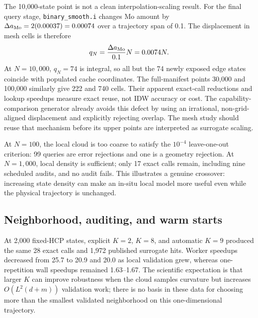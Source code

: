 \documentclass[11pt]{article}
\newcommand{\code}[1]{\texttt{#1}}
\begin{document}
The 10,000-state point is not a clean interpolation-scaling result.  For the final query stage,
\code{binary\_smooth.i} changes Mo amount by
\(\Delta a_{\rm Mo}=2(0.00037)=0.00074\) over a trajectory span of 0.1.  The displacement in mesh
cells is therefore
\begin{equation}
  q_N=\frac{\Delta a_{\rm Mo}}{0.1}N=0.0074N.
\end{equation}
At \(N=10{,}000\), \(q_N=74\) is integral, so all but the 74 newly exposed edge states coincide
with populated cache coordinates.  The full-manifest points 30,000 and 100,000 similarly give 222
and 740 cells.  Their apparent exact-call reductions and lookup speedups measure exact reuse, not
IDW accuracy or cost.  The capability-comparison generator already avoids this defect by using an
irrational, non-grid-aligned displacement and explicitly rejecting overlap.  The mesh study should
reuse that mechanism before its upper points are interpreted as surrogate scaling.

At \(N=100\), the local cloud is too coarse to satisfy the \(10^{-4}\) leave-one-out criterion:
99 queries are error rejections and one is a geometry rejection.  At \(N=1{,}000\), local density
is sufficient; only 17 exact calls remain, including nine scheduled audits, and no audit fails.
This illustrates a genuine crossover: increasing state density can make an in-situ local model
more useful even while the physical trajectory is unchanged.

\subsection{Neighborhood, auditing, and warm starts}

At 2,000 fixed-HCP states, explicit \(K=2\), \(K=8\), and automatic \(K=9\) produced the same 28
exact calls and 1,972 published surrogate hits.  Worker speedups decreased from 25.7 to 20.9 and
20.0 as local validation grew, whereas one-repetition wall speedups remained 1.63--1.67.  The
scientific expectation is that larger \(K\) can improve robustness when the cloud samples
curvature but increases \(O(L^2(d+m))\) validation work; there is no basis in these data for
choosing more than the smallest validated neighborhood on this one-dimensional trajectory.
\end{document}
